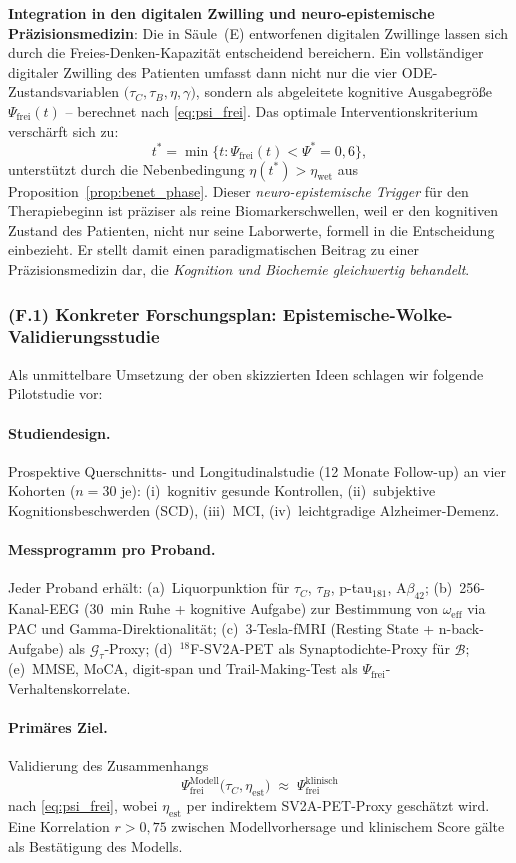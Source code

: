 ﻿\documentclass[12pt,a4paper]{article}
\theoremstyle{definition}
\begin{document}
	\textbf{Integration in den digitalen Zwilling und neuro-epistemische Präzisionsmedizin}:
	Die in Säule~(E) entworfenen digitalen Zwillinge lassen sich durch die Freies-Denken-Kapazität entscheidend bereichern. Ein vollständiger digitaler Zwilling des Patienten umfasst dann nicht nur die vier ODE-Zustandsvariablen $\bigl(\tau_C, \tau_B, \eta, \gamma\bigr)$, sondern als abgeleitete kognitive Ausgabegröße $\Psi_{\mathrm{frei}}(t)$ -- berechnet nach \cref{eq:psi_frei}. Das optimale Interventionskriterium verschärft sich zu:
	\[
		t^* = \min\bigl\{t : \Psi_{\mathrm{frei}}(t) < \Psi^* = 0{,}6\bigr\},
	\]
	unterstützt durch die Nebenbedingung $\eta(t^*) > \eta_{\mathrm{wet}}$ aus Proposition~\ref{prop:benet_phase}. Dieser \emph{neuro-epistemische Trigger} für den Therapiebeginn ist präziser als reine Biomarkerschwellen, weil er den kognitiven Zustand des Patienten, nicht nur seine Laborwerte, formell in die Entscheidung einbezieht. Er stellt damit einen paradigmatischen Beitrag zu einer Präzisionsmedizin dar, die \emph{Kognition und Biochemie gleichwertig behandelt}.

	\subsubsection*{(F.1) Konkreter Forschungsplan: Epistemische-Wolke-Validierungsstudie}

	Als unmittelbare Umsetzung der oben skizzierten Ideen schlagen wir folgende Pilotstudie vor:
	\paragraph{Studiendesign.}
	Prospektive Querschnitts- und Longitudinalstudie (12 Monate Follow-up) an vier Kohorten ($n=30$ je): (i)~kognitiv gesunde Kontrollen, (ii)~subjektive Kognitionsbeschwerden (SCD), (iii)~MCI, (iv)~leichtgradige Alzheimer-Demenz.
	\paragraph{Messprogramm pro Proband.}
	Jeder Proband erhält: (a)~Liquorpunktion für $\tau_C$, $\tau_B$, p-tau$_{181}$, A$\beta_{42}$; (b)~256-Kanal-EEG (30~min Ruhe + kognitive Aufgabe) zur Bestimmung von $\omega_{\mathrm{eff}}$ via PAC und Gamma-Direktionalität; (c)~3-Tesla-fMRI (Resting State + n-back-Aufgabe) als $\mathcal{G}_\tau$-Proxy; (d)~${}^{18}$F-SV2A-PET als Synaptodichte-Proxy für $\hat{\mathcal{B}}$; (e)~MMSE, MoCA, digit-span und Trail-Making-Test als $\Psi_{\mathrm{frei}}$-Verhaltenskorrelate.
	\paragraph{Primäres Ziel.}
	Validierung des Zusammenhangs
	\[
		\Psi_{\mathrm{frei}}^{\mathrm{Modell}}\bigl(\tau_C, \eta_{\mathrm{est}}\bigr) \;\approx\; \Psi_{\mathrm{frei}}^{\mathrm{klinisch}}
	\]
	nach \cref{eq:psi_frei}, wobei $\eta_{\mathrm{est}}$ per indirektem SV2A-PET-Proxy geschätzt wird. Eine Korrelation $r > 0{,}75$ zwischen Modellvorhersage und klinischem Score gälte als Bestätigung des Modells.
\end{document}
